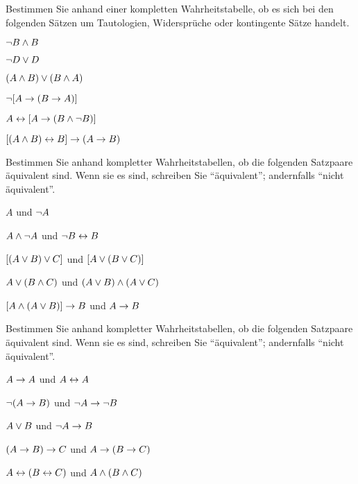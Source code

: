 \problempart Bestimmen Sie anhand einer kompletten Wahrheitstabelle, ob es sich bei den folgenden Sätzen um Tautologien, Widersprüche oder kontingente Sätze handelt.
\begin{earg}
\item $\neg B \wedge B$ \vspace{.5ex}%


\item $\neg D \vee D$ \vspace{.5ex}%


\item $(A\wedge B) \vee (B\wedge A)$\vspace{.5ex} %


\item $\neg[A \rightarrow (B \rightarrow A)]$\vspace{.5ex} %


\item $A \leftrightarrow [A \rightarrow (B \wedge \neg B)]$ \vspace{.5ex}%


\item $[(A \wedge B) \leftrightarrow B] \rightarrow (A \rightarrow B)$ \vspace{.5ex}%

\end{earg}

\noindent\problempart
\label{pr.TT.equiv}
Bestimmen Sie anhand kompletter Wahrheitstabellen, ob die folgenden Satzpaare äquivalent sind. Wenn sie es sind, schreiben Sie ``äquivalent''; andernfalls ``nicht äquivalent''. 
\begin{earg}
\item $A$ und $\neg A$
\item $A \wedge \neg A$ und $\neg B \leftrightarrow B$
\item $[(A \vee B) \vee C]$ und $[A \vee (B \vee C)]$
\item $A \vee (B \wedge C)$ und $(A \vee B) \wedge (A \vee C)$
\item $[A \wedge (A \vee B)] \rightarrow B$ und $A \rightarrow B$\end{earg}


\problempart
\label{pr.TT.equiv2}
Bestimmen Sie anhand kompletter Wahrheitstabellen, ob die folgenden Satzpaare äquivalent sind. Wenn sie es sind, schreiben Sie ``äquivalent''; andernfalls ``nicht äquivalent''. \begin{earg}
\item $A\rightarrow A$ und $A \leftrightarrow A$
\item $\neg(A \rightarrow B)$ und $\neg A \rightarrow \neg B$
\item $A \vee B$ und $\neg A \rightarrow B$
\item$(A \rightarrow B) \rightarrow C$ und $A \rightarrow (B \rightarrow C)$
\item $A \leftrightarrow (B \leftrightarrow C)$ und $A \wedge (B \wedge C)$
\end{earg}


